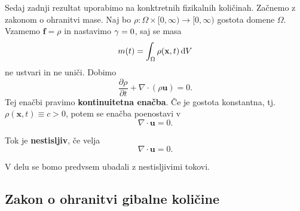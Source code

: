 \documentclass[mat2, tisk]{fmfdelo}
\newcommand{\bd}{\textbf}
\begin{document}
Sedaj zadnji rezultat uporabimo na konktretnih fizikalnih količinah. 
Začnemo z zakonom o ohranitvi mase. Naj bo $\rho: \Omega \times [0, \infty) \rightarrow [0, \infty)$
gostota domene $\Omega$. Vzamemo $\bd{f} = \rho$ in nastavimo $\bd{\text{$\gamma$}} = 0$, saj se 
masa 
$$
m(t)= \int_\Omega \rho(\bd{x}, t) \dif V
$$
ne ustvari in ne uniči. Dobimo 
\begin{equation}
\frac{\partial \rho}{\partial t} + \nabla \cdot (\rho \bd{u}) = 0.
\end{equation}
Tej enačbi pravimo \bd{kontinuitetna enačba}. Če je gostota konstantna, tj. $\rho(\bd{x}, t) \equiv c > 0$, potem se enačba poenostavi v  
\begin{equation}
\nabla \cdot \bd{u} = 0.
\end{equation}

\begin{definicija}
  Tok je \textbf{nestisljiv}, če velja 
  \begin{equation}
  \label{ohranitev mase}
    \nabla \cdot \bd{u} = 0.    
  \end{equation}
\end{definicija}

V delu se bomo predvsem ubadali z nestisljivimi tokovi.
\subsection{Zakon o ohranitvi gibalne količine}
\end{document}

